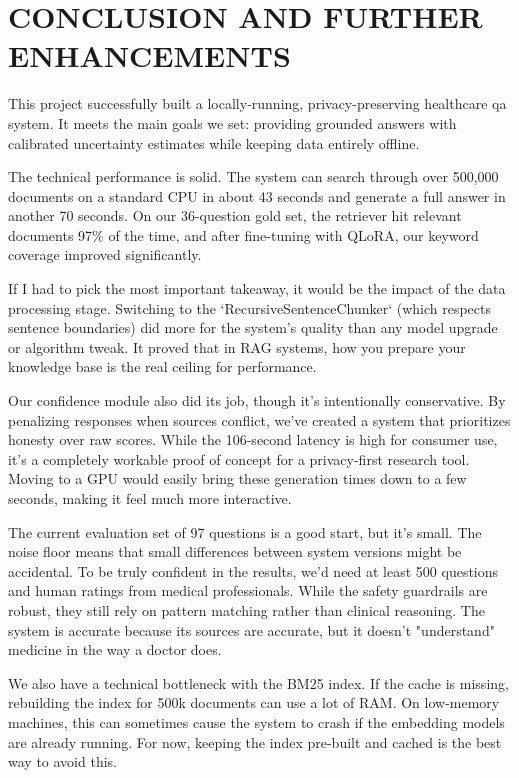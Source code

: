 \chapter{\MakeUppercase{Conclusion and Further Enhancements}}

This project successfully built a locally-running, privacy-preserving healthcare \ac{qa} system. It meets the main goals we set: providing grounded answers with calibrated uncertainty estimates while keeping data entirely offline. 

The technical performance is solid. The system can search through over 500,000 documents on a standard CPU in about 43 seconds and generate a full answer in another 70 seconds. On our 36-question gold set, the retriever hit relevant documents 97\% of the time, and after fine-tuning with QLoRA, our keyword coverage improved significantly.

If I had to pick the most important takeaway, it would be the impact of the data processing stage. Switching to the `RecursiveSentenceChunker` (which respects sentence boundaries) did more for the system's quality than any model upgrade or algorithm tweak. It proved that in RAG systems, how you prepare your knowledge base is the real ceiling for performance. 

Our confidence module also did its job, though it’s intentionally conservative. By penalizing responses when sources conflict, we’ve created a system that prioritizes honesty over raw scores. While the 106-second latency is high for consumer use, it's a completely workable proof of concept for a privacy-first research tool. Moving to a GPU would easily bring these generation times down to a few seconds, making it feel much more interactive.

The current evaluation set of 97 questions is a good start, but it's small. The noise floor means that small differences between system versions might be accidental. To be truly confident in the results, we’d need at least 500 questions and human ratings from medical professionals. While the safety guardrails are robust, they still rely on pattern matching rather than clinical reasoning. The system is accurate because its sources are accurate, but it doesn't "understand" medicine in the way a doctor does. 

We also have a technical bottleneck with the BM25 index. If the cache is missing, rebuilding the index for 500k documents can use a lot of RAM. On low-memory machines, this can sometimes cause the system to crash if the embedding models are already running. For now, keeping the index pre-built and cached is the best way to avoid this.

